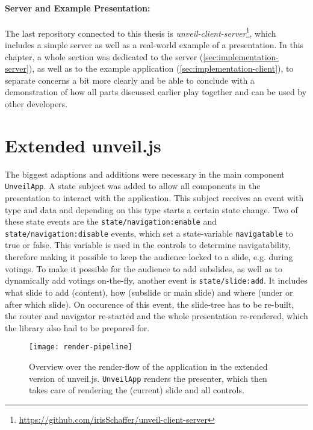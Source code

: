 \paragraph{Server and Example Presentation:} The last repository connected to this thesis is \emph{unveil-client-server}\footnote{\url{https://github.com/irisSchaffer/unveil-client-server}}, which includes a simple server as well as a real-world example of a presentation. In this chapter, a whole section was dedicated to the server (\ref{sec:implementation-server}), as well as to the example application (\ref{sec:implementation-client}), to separate concerns a bit more clearly and be able to conclude with a demonstration of how all parts discussed earlier play together and can be used by other developers.

\section{Extended unveil.js}
\label{sec:implementation-unveil}
The biggest adaptions and additions were necessary in the main component \texttt{UnveilApp}. A state subject was added to allow all components in the presentation to interact with the application. This subject receives an event with type and data and depending on this type starts a certain state change. Two of these state events are the \texttt{state/navigation:enable} and \texttt{state/navigation:disable} events, which set a state-variable \texttt{navigatable} to true or false. This variable is used in the controls to determine navigatability, therefore making it possible to keep the audience locked to a slide, e.g. during votings.
To make it possible for the audience to add subslides, as well as to dynamically add votings on-the-fly, another event is \texttt{state/slide:add}. It includes what slide to add (content), how (subslide or main slide) and where (under or after which slide). On occurence of this event, the slide-tree has to be re-built, the router and navigator re-started and the whole presentation re-rendered, which the library also had to be prepared for.

\begin{figure}
\centering
\texttt{[image: render-pipeline]}
\caption{Overview over the render-flow of the application in the extended version of unveil.js. \texttt{UnveilApp} renders the presenter, which then takes care of rendering the (current) slide and all controls.}
\label{fig:implementation-unveil-render-pipeline}
\end{figure}

